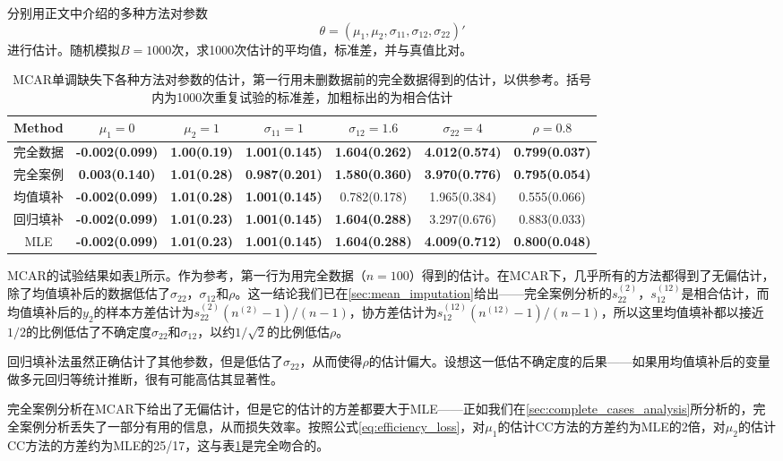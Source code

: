 \documentclass[aps,pre,12pt,preprint,onecolumn,showpacs,showkeys,AutoFakeBold]{revtex4-1}
\begin{document}
分别用正文中介绍的多种方法对参数
$$\theta = (\mu _1 , \mu _2, \sigma _{11}, \sigma _{12}, \sigma _{22})'$$
进行估计。随机模拟$B=1000$次，求1000次估计的平均值，标准差，并与真值比对。

\begin{table}[h]
    \caption{\label{tab:monotone_MCAR}%
    MCAR单调缺失下各种方法对参数的估计，第一行用未删数据前的完全数据得到的估计，以供参考。括号内为1000次重复试验的标准差，加粗标出的为相合估计}
    \begin{tabular}{|c|c|c|c|c|c|c|}
        \hline
        Method&$\mu _1=0$ &$\mu _2=1$&$\sigma _{11}=1$&$\sigma _{12}=1.6$&$\sigma _{22}=4$&$\rho=0.8$\\\hline
        完全数据&\textbf{-0.002(0.099)}&\textbf{1.00(0.19)}&\textbf{1.001(0.145)}&\textbf{1.604(0.262)}&\textbf{4.012(0.574)}&\textbf{0.799(0.037)}\\\hline
        完全案例&\textbf{0.003(0.140)}&\textbf{1.01(0.28)}&\textbf{0.987(0.201)}&\textbf{1.580(0.360)}&\textbf{3.970(0.776)}&\textbf{0.795(0.054)}\\\hline
        均值填补&\textbf{-0.002(0.099)}&\textbf{1.01(0.28)}&\textbf{1.001(0.145)}&0.782(0.178)&1.965(0.384)&0.555(0.066)\\\hline
        回归填补&\textbf{-0.002(0.099)}&\textbf{1.01(0.23)}&\textbf{1.001(0.145)}&\textbf{1.604(0.288)}&3.297(0.676)&0.883(0.033)\\\hline
        MLE&\textbf{-0.002(0.099)}&\textbf{1.01(0.23)}&\textbf{1.001(0.145)}&\textbf{1.604(0.288)}&\textbf{4.009(0.712)}&\textbf{0.800(0.048)}\\\hline
    \end{tabular}
\end{table}

MCAR的试验结果如表\ref{tab:monotone_MCAR}所示。作为参考，第一行为用完全数据（$n=100$）得到的估计。在MCAR下，几乎所有的方法都得到了无偏估计，除了均值填补后的数据低估了$ \sigma_{22}$，$ \sigma_{12}$和$\rho$。这一结论我们已在\ref{sec:mean_imputation}给出——完全案例分析的$s_{22}^{(2)}$，$s_{12}^{(12)}$是相合估计，而均值填补后的$y_2$的样本方差估计为$s_{22}^{(2)}(n^{(2)}-1)/(n-1)$，协方差估计为$s_{12}^{(12)}(n^{(12)}-1)/(n-1)$，所以这里均值填补都以接近$1/2$的比例低估了不确定度$\sigma_{22}$和$ \sigma_{12}$，以约$1/\sqrt 2$的比例低估$\rho$。

回归填补法虽然正确估计了其他参数，但是低估了$\sigma _{22}$，从而使得$\rho$的估计偏大。设想这一低估不确定度的后果——如果用均值填补后的变量做多元回归等统计推断，很有可能高估其显著性。

完全案例分析在MCAR下给出了无偏估计，但是它的估计的方差都要大于MLE——正如我们在\ref{sec:complete_cases_analysis}所分析的，完全案例分析丢失了一部分有用的信息，从而损失效率。按照公式\ref{eq:efficiency_loss}，对$\mu _1$的估计CC方法的方差约为MLE的2倍，对$\mu _2$的估计CC方法的方差约为MLE的25/17，这与表\ref{tab:monotone_MCAR}是完全吻合的。
\end{document}
